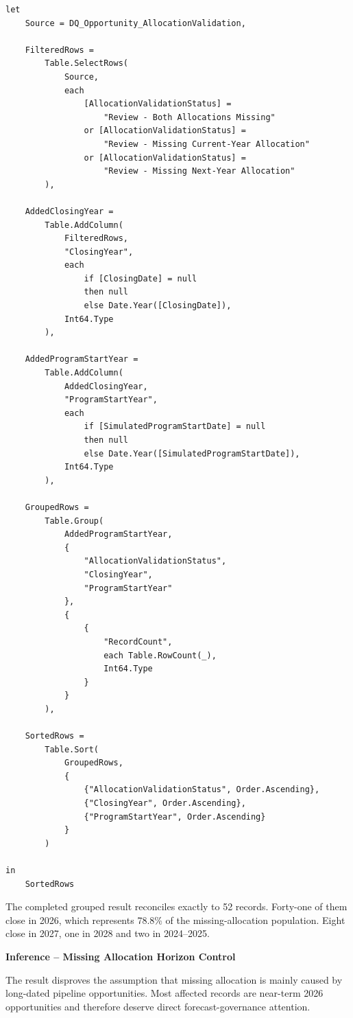 \documentclass[11pt,a4paper]{article}
\begin{document}
\begin{lstlisting}[style=powerquery]
let
    Source = DQ_Opportunity_AllocationValidation,

    FilteredRows =
        Table.SelectRows(
            Source,
            each
                [AllocationValidationStatus] =
                    "Review - Both Allocations Missing"
                or [AllocationValidationStatus] =
                    "Review - Missing Current-Year Allocation"
                or [AllocationValidationStatus] =
                    "Review - Missing Next-Year Allocation"
        ),

    AddedClosingYear =
        Table.AddColumn(
            FilteredRows,
            "ClosingYear",
            each
                if [ClosingDate] = null
                then null
                else Date.Year([ClosingDate]),
            Int64.Type
        ),

    AddedProgramStartYear =
        Table.AddColumn(
            AddedClosingYear,
            "ProgramStartYear",
            each
                if [SimulatedProgramStartDate] = null
                then null
                else Date.Year([SimulatedProgramStartDate]),
            Int64.Type
        ),

    GroupedRows =
        Table.Group(
            AddedProgramStartYear,
            {
                "AllocationValidationStatus",
                "ClosingYear",
                "ProgramStartYear"
            },
            {
                {
                    "RecordCount",
                    each Table.RowCount(_),
                    Int64.Type
                }
            }
        ),

    SortedRows =
        Table.Sort(
            GroupedRows,
            {
                {"AllocationValidationStatus", Order.Ascending},
                {"ClosingYear", Order.Ascending},
                {"ProgramStartYear", Order.Ascending}
            }
        )

in
    SortedRows
\end{lstlisting}

The completed grouped result reconciles exactly to 52 records. Forty-one of them
close in 2026, which represents 78.8\% of the missing-allocation population.
Eight close in 2027, one in 2028 and two in 2024--2025.

\begin{inferencebox}

\textbf{Inference -- Missing Allocation Horizon Control}

The result disproves the assumption that missing allocation is mainly caused by
long-dated pipeline opportunities. Most affected records are near-term 2026
opportunities and therefore deserve direct forecast-governance attention.

\end{inferencebox}
\end{document}
